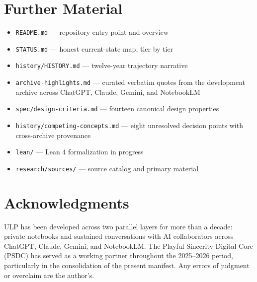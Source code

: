 \documentclass[11pt, letterpaper]{article}
\begin{document}
\section*{Further Material}

\begin{itemize}[leftmargin=*, itemsep=0.2em]
    \item \texttt{README.md} --- repository entry point and overview
    \item \texttt{STATUS.md} --- honest current-state map, tier by tier
    \item \texttt{history/HISTORY.md} --- twelve-year trajectory narrative
    \item \texttt{archive-highlights.md} --- curated verbatim quotes from the development archive across ChatGPT, Claude, Gemini, and NotebookLM
    \item \texttt{spec/design-criteria.md} --- fourteen canonical design properties
    \item \texttt{history/competing-concepts.md} --- eight unresolved decision points with cross-archive provenance
    \item \texttt{lean/} --- Lean 4 formalization in progress
    \item \texttt{research/sources/} --- source catalog and primary material
\end{itemize}

\section*{Acknowledgments}

ULP has been developed across two parallel layers for more than a decade: private notebooks and sustained conversations with AI collaborators across ChatGPT, Claude, Gemini, and NotebookLM. The Playful Sincerity Digital Core (PSDC) has served as a working partner throughout the 2025--2026 period, particularly in the consolidation of the present manifest. Any errors of judgment or overclaim are the author's.
\end{document}
